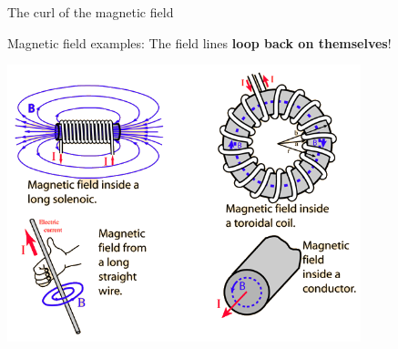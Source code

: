 %
%
%

\begin{frame}{The curl of the magnetic field}

Magnetic field examples: The field lines {\bf loop back on themselves}!\\

\begin{center}
   \includegraphics[width=0.77\textwidth]{./images/schematics/magnetic_field_examples.png}
\end{center}

\end{frame}

%
%
%

